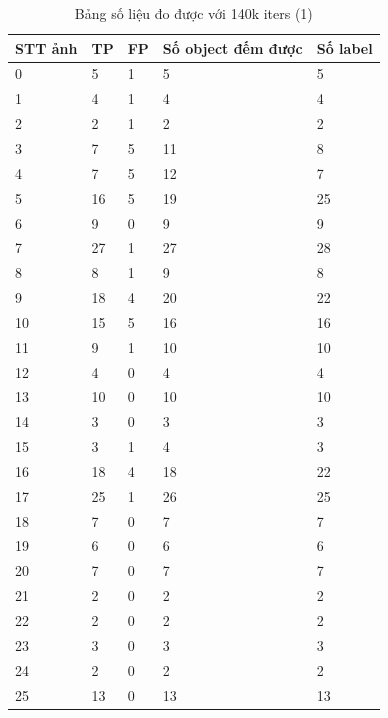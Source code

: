 \begin{table}[H]
    \begin{tabular}{p{2cm}  p{2cm}  p{2cm} p{4cm} p{2cm} }
    \hline		
	STT ảnh & TP & FP & Số object đếm được & Số label\\
	\hline
	   0   & 5  & 1  &     5     &   5   \\		\hline
   1   & 4  & 1  &     4     &   4   \\     \hline
   2   & 2  & 1  &     2     &   2   \\     \hline
   3   & 7  & 5  &     11    &   8   \\     \hline
   4   & 7  & 5  &     12    &   7   \\     \hline
   5   & 16 & 5  &     19    &   25  \\     \hline
   6   & 9  & 0  &     9     &   9   \\     \hline
   7   & 27 & 1  &     27    &   28  \\     \hline
   8   & 8  & 1  &     9     &   8   \\     \hline
   9   & 18 & 4  &     20    &   22  \\     \hline
   10  & 15 & 5  &     16    &   16  \\     \hline
   11  & 9  & 1  &     10    &   10  \\     \hline
   12  & 4  & 0  &     4     &   4   \\     \hline
   13  & 10 & 0  &     10    &   10  \\     \hline
   14  & 3  & 0  &     3     &   3   \\     \hline
   15  & 3  & 1  &     4     &   3   \\     \hline
   16  & 18 & 4  &     18    &   22  \\     \hline
   17  & 25 & 1  &     26    &   25  \\     \hline
   18  & 7  & 0  &     7     &   7   \\     \hline
   19  & 6  & 0  &     6     &   6   \\     \hline
   20  & 7  & 0  &     7     &   7   \\     \hline
   21  & 2  & 0  &     2     &   2   \\     \hline
   22  & 2  & 0  &     2     &   2   \\     \hline
   23  & 3  & 0  &     3     &   3   \\     \hline
   24  & 2  & 0  &     2     &   2   \\     \hline
   25  & 13 & 0  &     13    &   13  \\     \hline
	\end{tabular}
	\caption{Bảng số liệu đo được với 140k iters (1)}
    \label{chap3:case1:table01}    
\end{table}

